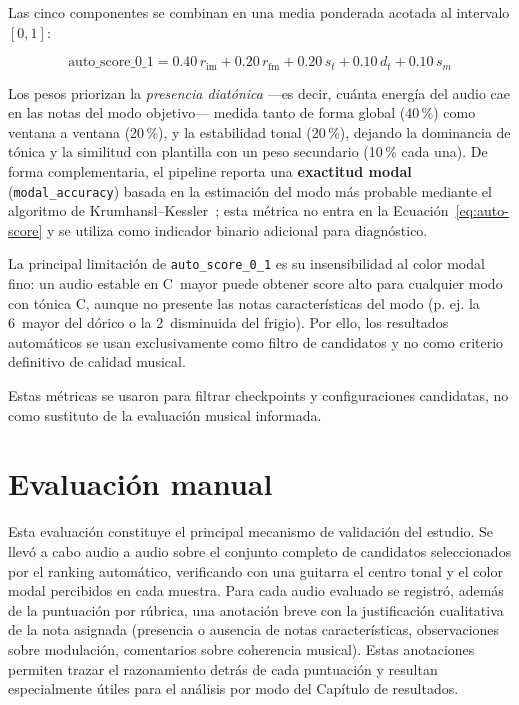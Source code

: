 \documentclass[%
    school=etsisi,%
    type=pfg,%
    degree=61CD,%
]{upm-report}
\begin{document}
Las cinco componentes se combinan en una media ponderada acotada al intervalo $[0,1]$:

\begin{equation}
    \text{auto\_score\_0\_1} = 0.40\,r_\text{im} + 0.20\,r_\text{fm} + 0.20\,s_t + 0.10\,d_t + 0.10\,s_m
    \label{eq:auto-score}
\end{equation}

Los pesos priorizan la \emph{presencia diat\'onica} ---es decir, cu\'anta energ\'ia del audio cae en las notas del modo objetivo--- medida tanto de forma global (40\,\%) como ventana a ventana (20\,\%), y la estabilidad tonal (20\,\%), dejando la dominancia de t\'onica y la similitud con plantilla con un peso secundario (10\,\% cada una). De forma complementaria, el pipeline reporta una \textbf{exactitud modal} (\texttt{modal\_accuracy}) basada en la estimaci\'on del modo m\'as probable mediante el algoritmo de Krumhansl--Kessler~\cite{krumhansl1982}; esta m\'etrica no entra en la Ecuaci\'on~\ref{eq:auto-score} y se utiliza como indicador binario adicional para diagn\'ostico.

La principal limitaci\'on de \texttt{auto\_score\_0\_1} es su insensibilidad al color modal fino: un audio estable en C~mayor puede obtener score alto para cualquier modo con t\'onica C, aunque no presente las notas caracter\'isticas del modo (p. ej. la 6\textordfeminine~mayor del d\'orico o la 2\textordfeminine~disminuida del frigio). Por ello, los resultados autom\'aticos se usan exclusivamente como filtro de candidatos y no como criterio definitivo de calidad musical.

Estas m\'etricas se usaron para filtrar checkpoints y configuraciones candidatas, no como sustituto de la evaluaci\'on musical informada.

\section{Evaluaci\'on manual}

Esta evaluaci\'on constituye el principal mecanismo de validaci\'on del estudio. Se llev\'o a cabo audio a audio sobre el conjunto completo de candidatos seleccionados por el ranking autom\'atico, verificando con una guitarra el centro tonal y el color modal percibidos en cada muestra. Para cada audio evaluado se registr\'o, adem\'as de la puntuaci\'on por r\'ubrica, una anotaci\'on breve con la justificaci\'on cualitativa de la nota asignada (presencia o ausencia de notas caracter\'isticas, observaciones sobre modulaci\'on, comentarios sobre coherencia musical). Estas anotaciones permiten trazar el razonamiento detr\'as de cada puntuaci\'on y resultan especialmente \'utiles para el an\'alisis por modo del Cap\'itulo de resultados.
\end{document}
